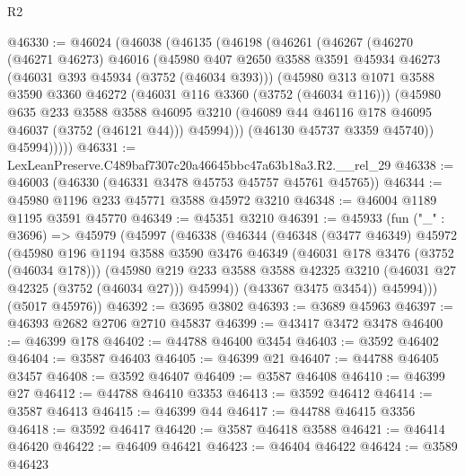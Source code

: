 \begin{lexlean}{R2}
\begin{coremodule}
@46330 := @46024
    (@46038
      (@46135
        (@46198
          (@46261
            (@46267
              (@46270
                (@46271 @46273)
                @46016
                (@45980
                  @407
                  @2650
                  @3588
                  @3591
                  @45934
                  @46273
                  (@46031 @393 @45934 (@3752 (@46034 @393)))
                  (@45980
                    @313
                    @1071
                    @3588
                    @3590
                    @3360
                    @46272
                    (@46031 @116 @3360 (@3752 (@46034 @116)))
                    (@45980
                      @635
                      @233
                      @3588
                      @3588
                      @46095
                      @3210
                      (@46089 @44 @46116 @178 @46095 @46037 (@3752 (@46121 @44)))
                      @45994)))
                (@46130 @45737 @3359 @45740))
              @45994)))))
@46331 := LexLeanPreserve.C489baf7307c20a46645bbc47a63b18a3.R2.__rel_29
@46338 := @46003 (@46330 (@46331 @3478 @45753 @45757 @45761 @45765))
@46344 := @45980 @1196 @233 @45771 @3588 @45972 @3210
@46348 := @46004 @1189 @1195 @3591 @45770
@46349 := @45351 @3210
@46391 := @45933
    (fun ("_" : @3696) =>
    @45979
      (@45997
        (@46338
          (@46344
            (@46348
              (@3477 @46349)
              @45972
              (@45980
                @196
                @1194
                @3588
                @3590
                @3476
                @46349
                (@46031 @178 @3476 (@3752 (@46034 @178)))
                (@45980
                  @219
                  @233
                  @3588
                  @3588
                  @42325
                  @3210
                  (@46031 @27 @42325 (@3752 (@46034 @27)))
                  @45994))
              (@43367 @3475 @3454))
            @45994)))
      (@5017 @45976))
@46392 := @3695 @3802
@46393 := @3689 @45963
@46397 := @46393 @2682 @2706 @2710 @45837
@46399 := @43417 @3472 @3478
@46400 := @46399 @178
@46402 := @44788 @46400 @3454
@46403 := @3592 @46402
@46404 := @3587 @46403
@46405 := @46399 @21
@46407 := @44788 @46405 @3457
@46408 := @3592 @46407
@46409 := @3587 @46408
@46410 := @46399 @27
@46412 := @44788 @46410 @3353
@46413 := @3592 @46412
@46414 := @3587 @46413
@46415 := @46399 @44
@46417 := @44788 @46415 @3356
@46418 := @3592 @46417
@46420 := @3587 @46418 @3588
@46421 := @46414 @46420
@46422 := @46409 @46421
@46423 := @46404 @46422
@46424 := @3589 @46423

\end{coremodule}
\end{lexlean}
